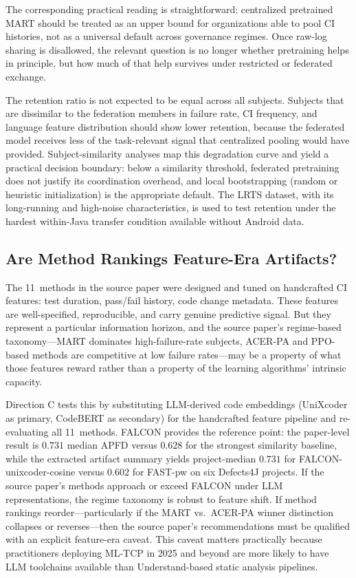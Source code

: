 \documentclass[10pt,conference]{IEEEtran}
\begin{document}
The corresponding practical reading is straightforward: centralized pretrained MART should be treated as an upper bound for organizations able to pool CI histories, not as a universal default across governance regimes. Once raw-log sharing is disallowed, the relevant question is no longer whether pretraining helps in principle, but how much of that help survives under restricted or federated exchange.

The retention ratio is not expected to be equal across all subjects. Subjects that are dissimilar to the federation members in failure rate, CI frequency, and language feature distribution should show lower retention, because the federated model receives less of the task-relevant signal that centralized pooling would have provided. Subject-similarity analyses map this degradation curve and yield a practical decision boundary: below a similarity threshold, federated pretraining does not justify its coordination overhead, and local bootstrapping (random or heuristic initialization) is the appropriate default. The LRTS dataset, with its long-running and high-noise characteristics, is used to test retention under the hardest within-Java transfer condition available without Android data.

\subsection{Are Method Rankings Feature-Era Artifacts?}

The 11~methods in the source paper were designed and tuned on handcrafted CI features: test duration, pass/fail history, code change metadata. These features are well-specified, reproducible, and carry genuine predictive signal. But they represent a particular information horizon, and the source paper's regime-based taxonomy---MART dominates high-failure-rate subjects, ACER-PA and PPO-based methods are competitive at low failure rates---may be a property of what those features reward rather than a property of the learning algorithms' intrinsic capacity.

Direction C tests this by substituting LLM-derived code embeddings (UniXcoder as primary, CodeBERT as secondary) for the handcrafted feature pipeline and re-evaluating all 11~methods. FALCON provides the reference point: the paper-level result is $0.731$ median APFD versus $0.628$ for the strongest similarity baseline, while the extracted artifact summary yields project-median $0.731$ for FALCON-unixcoder-cosine versus $0.602$ for FAST-pw on six Defects4J projects. If the source paper's methods approach or exceed FALCON under LLM representations, the regime taxonomy is robust to feature shift. If method rankings reorder---particularly if the MART vs.\ ACER-PA winner distinction collapses or reverses---then the source paper's recommendations must be qualified with an explicit feature-era caveat. This caveat matters practically because practitioners deploying ML-TCP in 2025 and beyond are more likely to have LLM toolchains available than Understand-based static analysis pipelines.
\end{document}
